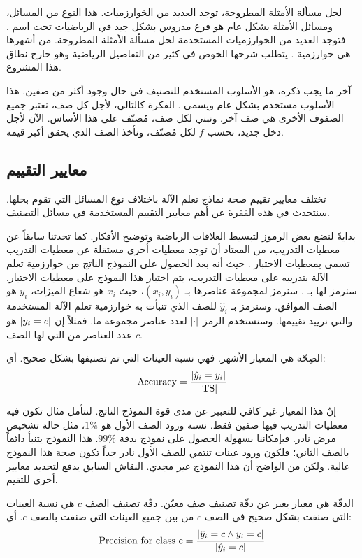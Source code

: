 لحل مسألة الأمثلة المطروحة، توجد العديد من الخوارزميات. هذا النوع من المسائل، ومسائل الأمثلة بشكل عام هو فرع
مدروس بشكل جيد في الرياضيات تحت اسم .
فتوجد العديد من الخوارزميات المستخدمة لحل مسألة الأمثلة المطروحة.
من أشهرها هي خوارزمية
%
. يتطلب شرحها الخوض في كثير من التفاصيل الرياضية وهو خارج نطاق هذا المشروع.

آخر ما يجب ذكره، هو الأسلوب المستخدم للتصنيف في حال وجود أكثر من صفين.
هذا الأسلوب مستخدم بشكل عام ويسمى
%
. الفكرة كالتالي، لأجل كل صف، نعتبر جميع الصفوف الأخرى هي صف آخر.
ونبني لكل صف، مُصنّف على هذا الأساس.
الآن لأجل دخل جديد، نحسب $f$ لكل مُصنّف، ونأخذ الصف الذي يحقق أكبر قيمة.



\subsection{معايير التقييم}
تختلف معايير تقييم صحة نماذج تعلم الآلة باختلاف نوع المسائل التي تقوم بحلها.
سنتحدث في هذه الفقرة عن أهم معايير التقييم المستخدمة في مسائل التصنيف.

بدايةً لنضع بعض الرموز لتبسيط العلاقات الرياضية وتوضيح الأفكار.
كما تحدثنا سابقاً عن معطيات التدريب،
من المعتاد أن توجد معطيات أخرى مستقلة عن معطيات التدريب تسمى بمعطيات الاختبار .
حيث أنه بعد الحصول على النموذج الناتج من خوارزمية تعلم الآلة بتدريبه على معطيات التدريب،
يتم اختبار هذا النموذج على معطيات الاختبار.
سنرمز لها بـ .
سنرمز لمجموعة عناصرها بـ $ (x_i, y_i) $، حيث $x_i$ هو شعاع الميزات، $y_i$ هو الصف الموافق.
وسنرمز بـ $\hat{y}_i$ للصف الذي تنبأت به خوارزمية تعلم الآلة المستخدمة والتي نرييد تقييمها.
وسنستخدم الرمز $ \left\vert\cdot\right\vert $ لعدد عناصر مجموعة ما.
فمثلاً إن $ \left\vert y_i = c\right\vert $ هو عدد العناصر من  التي لها الصف $c$.

الصِحّة  هي المعيار الأشهر. فهي نسبة العينات التي تم تصنيفها بشكل صحيح. أي:
$$ \mathrm{Accuracy} = \frac{ \left\vert\hat{y}_i = y_i\right\vert }{ \left\vert \mathrm{TS} \right\vert } $$

إنّ هذا المعيار غير كافي للتعبير عن مدى قوة النموذج الناتج.
لنتأمل مثال تكون فيه معطيات التدريب فيها صفين فقط.
نسبة ورود الصف الأول هو $1\%$،
مثل حالة تشخيص مرض نادر.
فبإمكاننا بسهولة الحصول على نموذج بدقة $99\%$.
هذا النموذج يتنبأ دائماً بالصف الثاني؛
فلكون ورود عينات تنتمي للصف الأول نادر جداً تكون صحة هذا النموذج عالية.
ولكن من الواضح أن هذا النموذج غير مجدي.
النقاش السابق يدفع لتحديد معايير أخرى للتقيم.

الدقّة  هي معيار يعبر عن دقّة تصنيف صف معيّن.
دقّة تصنيف الصف $c$ هي نسبة العينات التي صنفت بشكل صحيح في الصف $c$ من بين جميع العينات التي صنفت بالصف $c$.
أي:
$$ \mathrm{Precision\ for\ class\ c} = \frac{ \left\vert \hat{y}_i = c \wedge y_i = c \right\vert }
{ \left\vert \hat{y}_i = c \right\vert } $$

